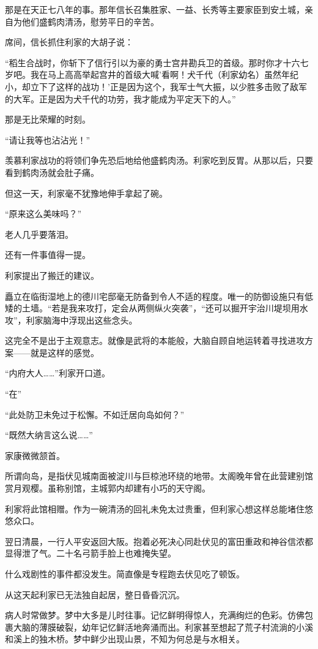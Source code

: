 \documentclass[
]{book}
\begin{document}
那是在天正七八年的事。那年信长召集胜家、一益、长秀等主要家臣到安土城，亲自为他们盛鹤肉清汤，慰劳平日的辛苦。

席间，信长抓住利家的大胡子说：

``稻生合战时，你斩下了信行引以为豪的勇士宫井勘兵卫的首级。那时你才十六七岁吧。我在马上高高举起宫井的首级大喊'看啊！犬千代（利家幼名）虽然年纪小，却立下了这样的战功！'正是因为这个，我军士气大振，以少胜多击败了敌军的大军。正是因为犬千代的功劳，我才能成为平定天下的人。''

那是无比荣耀的时刻。

``请让我等也沾沾光！''

羡慕利家战功的将领们争先恐后地给他盛鹤肉汤。利家吃到反胃。从那以后，只要看到鹤肉汤就会肚子痛。

但这一天，利家毫不犹豫地伸手拿起了碗。

``原来这么美味吗？''

老人几乎要落泪。

还有一件事值得一提。

利家提出了搬迁的建议。

矗立在临街湿地上的德川宅邸毫无防备到令人不适的程度。唯一的防御设施只有低矮的土墙。``若是我来攻打，定会从两侧纵火突袭''，``还可以掘开宇治川堤坝用水攻''，利家脑海中浮现出这些念头。

这完全不是出于主观意志。就像是武将的本能般，大脑自顾自地运转着寻找进攻方案------就是这样的感觉。

``内府大人\ldots\ldots{}''利家开口道。

``在''

``此处防卫未免过于松懈。不如迁居向岛如何？''

``既然大纳言这么说\ldots\ldots{}''

家康微微颔首。

所谓向岛，是指伏见城南面被淀川与巨椋池环绕的地带。太阁晚年曾在此营建别馆赏月观樱。虽称别馆，主城郭内却建有小巧的天守阁。

利家将此馆相赠。作为一碗清汤的回礼未免太过贵重，但利家心想这样总能堵住悠悠众口。

翌日清晨，一行人平安返回大阪。抱着必死决心同赴伏见的富田重政和神谷信浓都显得泄了气。二十名弓箭手脸上也难掩失望。

什么戏剧性的事件都没发生。简直像是专程跑去伏见吃了顿饭。

从这天起利家已无法独自起居，整日昏昏沉沉。

病人时常做梦。梦中大多是儿时往事。记忆鲜明得惊人，充满绚烂的色彩。仿佛包裹大脑的薄膜破裂，幼年记忆鲜活地奔涌而出。利家甚至想起了荒子村流淌的小溪和溪上的独木桥。梦中鲜少出现山景，不知为何总是与水相关。
\end{document}
